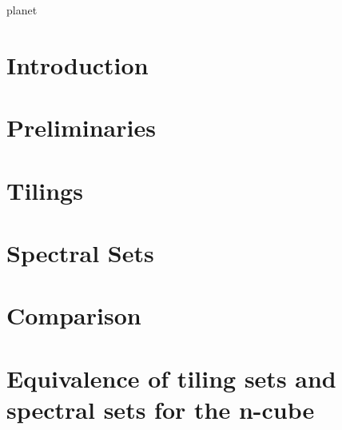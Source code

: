 \documentclass[british, oneside]{ntnuthesis}
\begin{document}

    \tableofcontents


planet
    \chapter{Introduction}
        

    \chapter{Preliminaries}
        
    
    \chapter{Tilings}
        

    \chapter{Spectral Sets}
        
    
    \chapter{Comparison}\label{chap:comparison}
        
    
    \chapter{Equivalence of tiling sets and spectral sets for the n-cube}
        


    \printbibliography
\end{document}
